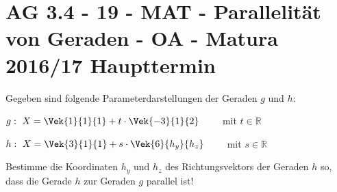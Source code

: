 \section{AG 3.4 - 19 - MAT - Parallelität von Geraden - OA - Matura 2016/17 Haupttermin}

\begin{beispiel}[AG 3.4]{1} %
Gegeben sind folgende Parameterdarstellungen der Geraden $g$ und $h$:\leer

$g:~ X=\Vek{1}{1}{1}+t\cdot \Vek{-3}{1}{2} \qquad$ mit $t\in \mathbb{R}$

$h:~ X=\Vek{3}{1}{1}+s\cdot \Vek{6}{h_y}{h_z} \qquad$ mit $s\in \mathbb{R}$ \leer

Bestimme die Koordinaten $h_y$ und $h_z$ des Richtungsvektors der Geraden $h$ so, dass die
Gerade $h$ zur Geraden $g$ parallel ist!


\end{beispiel}